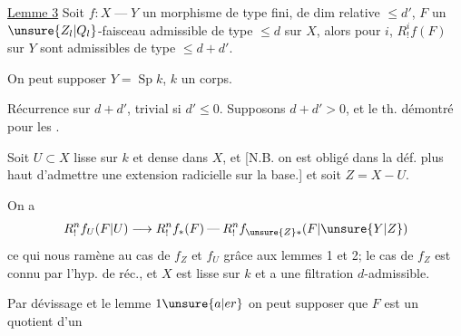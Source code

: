 \uline{Lemme 3}\quad
Soit \(f:X\mathbin{\text{---}}Y\) un morphisme
 de type fini, de dim relative \(\le d'\),
\(F\) un \(\unsure{Z_l|Q_l}\)-faisceau admissible de type \(\le d\) sur \(X\),
alors pour  \(i\), \(R^i_!f(F)\) sur \(Y\)
sont admissibles de type \(\le d+d'\).

On peut supposer \(Y=\operatorname{Sp}k\), \(k\) un corps.

Récurrence sur \(d+d'\), trivial si \(d'\le0\).
Supposons \(d+d'>0\), et le th. démontré pour les
 .

Soit \(U\subset X\)  lisse sur \(k\) et dense dans \(X\),
et 
[N.B. on est obligé dans la déf. plus haut d'admettre une extension radicielle sur la base.]
et soit \(Z=X-U\).

On a
\[
R^n_!f_U(F|U)\longrightarrow R^n_!f_*(F)
\mathbin{\text{---}} R^n_!f_{\unsure{Z}*}(F|\unsure{Y|Z})
\]
ce qui nous ramène au cas de \(f_Z\) et \(f_U\) grâce aux lemmes 1 et 2;
le cas de \(f_Z\) est connu par l'hyp. de réc.,
et   \(X\) est lisse
sur \(k\) et a une filtration \(d\)-admissible.

Par dévissage et le lemme \(1\unsure{a|er}\) on peut supposer que \(F\)
est un quotient  d'un
